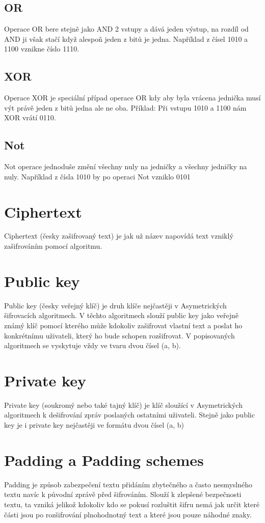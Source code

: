 \documentclass[12pt,a4paper]{report}
\begin{document}
\subsection{OR}
Operace OR bere stejně jako AND 2 vstupy a dává jeden výstup, na rozdíl od AND ji však stačí když alespoň jeden z bitů je jedna. Například z čísel 1010 a 1100 vznikne číslo 1110.

\subsection{XOR}
Operace XOR je speciální případ operace OR kdy aby byla vrácena jednička musí výt právě jeden z bitů jedna ale ne oba. Příklad: Při vstupu 1010 a 1100 nám XOR vrátí 0110.

\subsection{Not}
Not operace jednoduše změní všechny nuly na jedničky a všechny jedničky na nuly. Například z čísla 1010 by po operaci Not vzniklo 0101

\section{Ciphertext}
Ciphertext (česky zašifrovaný text) je jak už název napovídá text vzniklý zašifrováním pomocí algoritmu.

\section{Public key}
Public key (česky veřejný klíč) je druh klíče nejčastěji v Asymetrických šifrovacích algoritmech. V těchto algoritmech slouží public key jako veřejně známý klíč pomocí kterého může kdokoliv zašifrovat vlastní text a poslat ho konkrétnímu uživateli, který ho bude schopen rozšifrovat. V popisovaných algoritmech se vyskytuje vždy ve tvaru dvou čísel (a, b).

\section{Private key}
Private key (soukromý nebo také tajný klíč) je klíč sloužící v Asymetrických algoritmech k dešifrování zpráv poslaných ostatními uživateli. Stejně jako public key je i private key nejčastěji ve formátu dvou čísel (a, b)

\section{Padding a Padding schemes}
Padding je způsob zabezpečení textu přidáním zbytečného a často nesmyslného textu navíc k původní zprávě před šifrováním. Slouží k zlepšené bezpečnosti textu, ta vzniká jelikož kdokoliv kdo se pokusí rozluštit šifru nemá jak určit které části jsou po rozšifrování plnohodnotný text a které jsou pouze náhodné znaky.
\end{document}
